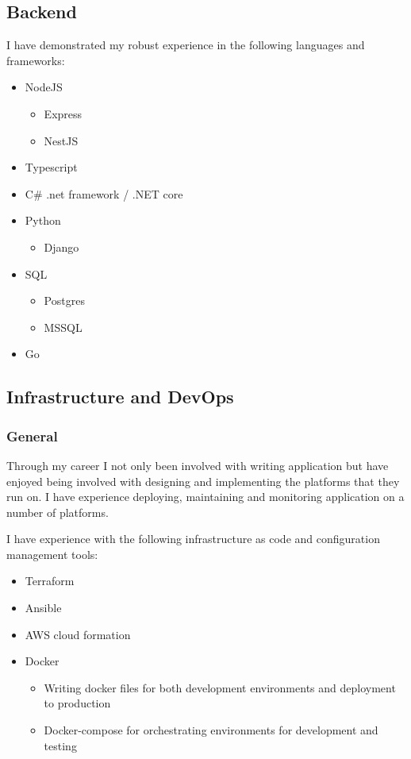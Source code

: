 \documentclass[11pt]{article}
\begin{document}
\subsection*{Backend}
\label{sec:orgaae88ff}

I have demonstrated my robust experience in the following languages and frameworks:

\begin{itemize}
\item NodeJS
\begin{itemize}
\item Express
\item NestJS
\end{itemize}
\item Typescript
\item C\# .net framework / .NET core
\item Python
\begin{itemize}
\item Django
\end{itemize}
\item SQL
\begin{itemize}
\item Postgres
\item MSSQL
\end{itemize}
\item Go
\end{itemize}
\subsection*{Infrastructure and DevOps}
\label{sec:orgf18a475}

\subsubsection*{General}
\label{sec:org29fce5d}

Through my career I not only been involved with writing application but have enjoyed being involved with designing and implementing the platforms that they run on. I have experience deploying, maintaining and monitoring application on a number of platforms.

I have experience with the following infrastructure as code and configuration management tools:

\begin{itemize}
\item Terraform
\item Ansible
\item AWS cloud formation
\item Docker
\begin{itemize}
\item Writing docker files for both development environments and deployment to production
\item Docker-compose for orchestrating environments for development and testing
\end{itemize}
\end{itemize}
\end{document}
